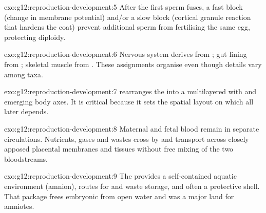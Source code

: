 \begin{solution}{exo:g12:reproduction-development:5}
After the first sperm fuses, a fast block (change in membrane potential)
and/or a slow block (cortical granule reaction that hardens the coat) prevent
additional sperm from fertilising the same egg, protecting diploidy.
\end{solution}

\begin{solution}{exo:g12:reproduction-development:6}
Nervous system derives from ; gut lining from ; skeletal
muscle from . These assignments organise  even though
details vary among taxa.
\end{solution}

\begin{solution}{exo:g12:reproduction-development:7}
 rearranges the  into a multilayered  with  and emerging body axes. It is critical because it sets the spatial
layout on which all later  depends.
\end{solution}

\begin{solution}{exo:g12:reproduction-development:8}
Maternal and fetal blood remain in separate circulations. Nutrients, gases
and wastes cross by  and transport across closely apposed placental
membranes and tissues without free mixing of the two bloodstreams.
\end{solution}

\begin{solution}{exo:g12:reproduction-development:9}
The  provides a self-contained aquatic environment (amnion),
routes for  and waste storage, and often a protective shell. That
package frees embryonic  from open water and was a major land
 for amniotes.
\end{solution}

